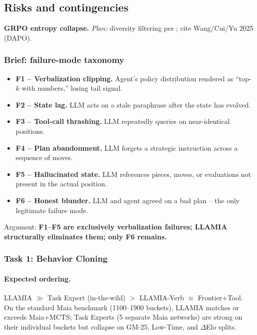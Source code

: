 \subsection{Risks and contingencies}
\label{sec:todo_risks}

\item \textbf{GRPO entropy collapse.}
\emph{Plan:} diversity filtering per
\cite{TNZse5q2Tr-creative-puzzles}; cite Wang/Cui/Yu 2025 (DAPO).

\subsubsection*{Brief: failure-mode taxonomy}
\label{brief:failure}

\begin{itemize}[leftmargin=*]
    \item \textbf{F1 -- Verbalization clipping.} Agent's policy
    distribution rendered as ``top-$k$ with numbers,'' losing tail
    signal.
    \item \textbf{F2 -- State lag.} LLM acts on a stale
    paraphrase after the state has evolved.
    \item \textbf{F3 -- Tool-call thrashing.} LLM repeatedly queries
    on near-identical positions.
    \item \textbf{F4 -- Plan abandonment.} LLM forgets a strategic
    instruction across a sequence of moves.
    \item \textbf{F5 -- Hallucinated state.} LLM references pieces,
    moves, or evaluations not present in the actual position.
    \item \textbf{F6 -- Honest blunder.} LLM and agent agreed on a bad
    plan -- the only legitimate failure mode.
\end{itemize}
Argument: \textbf{F1--F5 are exclusively verbalization failures;
LLAMIA structurally eliminates them; only F6 remains.}

\subsubsection*{Task 1: Behavior Cloning}
\label{sec:perf_bc}

\paragraph{Expected ordering.}
LLAMIA $\gg$ Task Expert (in-the-wild) $>$ LLAMIA-Verb $\approx$
Frontier+Tool. On the standard Maia
benchmark (1100--1900 buckets), LLAMIA matches or exceeds Maia+MCTS;
Task Experts (5 separate Maia networks) are strong on their
individual buckets but collapse on GM-25, Low-Time, and
$\Delta$Elo splits.

